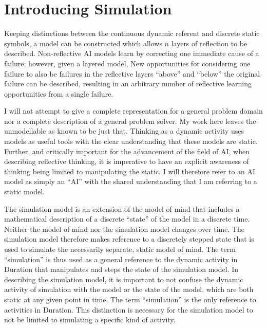 \chapter{Introducing Simulation}
\label{chapter:introducting_simulation}

Keeping distinctions between the continuous dynamic referent and
discrete static symbols, a model can be constructed which allows $n$
layers of reflection to be described.  Non-reflective AI models learn
by correcting one immediate cause of a failure; however, given a
layered model, New opportunities for considering one failure to also
be failures in the reflective layers ``above'' and ``below'' the
original failure can be described, resulting in an arbitrary number of
reflective learning opportunities from a single failure.

I will not attempt to give a complete representation for a general
problem domain nor a complete description of a general problem solver.
My work here leaves the unmodellable as known to be just that.
Thinking as a dynamic activity uses models as useful tools with the
clear understanding that these models are static.  Further, and
critically important for the advancement of the field of AI, when
describing reflective thinking, it is imperative to have an explicit
awareness of thinking being limited to manipulating the static.  I
will therefore refer to an AI model as simply an ``AI'' with the
shared understanding that I am referring to a static model.

The simulation model is an extension of the model of mind that
includes a mathematical description of a discrete ``state'' of the
model in a discrete time.  Neither the model of mind nor the
simulation model changes over time.  The simulation model therefore
makes reference to a discretely stepped state that is used to simulate
the necessarily separate, static model of mind.  The term
``simulation'' is thus used as a general reference to the dynamic
activity in Duration that manipulates and steps the state of the
simulation model.  In describing the simulation model, it is important
to not confuse the dynamic activity of simulation with the model or
the state of the model, which are both static at any given point in
time.  The term ``simulation'' is the only reference to activities in
Duration.  This distinction is necessary for the simulation model to
not be limited to simulating a specific kind of activity.

